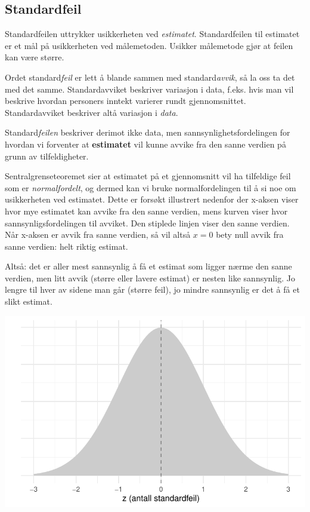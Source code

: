 \documentclass[
  letterpaper,
  DIV=11,
  numbers=noendperiod]{scrreprt}
\theoremstyle{definition}
\theoremstyle{remark}
\begin{document}
\hypertarget{standardfeil}{%
\subsection{Standardfeil}\label{standardfeil}}

Standardfeilen uttrykker usikkerheten ved \emph{estimatet}.
Standardfeilen til estimatet er et mål på usikkerheten ved målemetoden.
Usikker målemetode gjør at feilen kan være større.

Ordet standard\emph{feil} er lett å blande sammen med
standard\emph{avvik}, så la oss ta det med det samme. Standardavviket
beskriver variasjon i data, f.eks. hvis man vil beskrive hvordan
personers inntekt varierer rundt gjennomsnittet. Standardavviket
beskriver altå variasjon i \emph{data}.

Standard\emph{feilen} beskriver derimot ikke data, men
sannsynlighetsfordelingen for hvordan vi forventer at \textbf{estimatet}
vil kunne avvike fra den sanne verdien på grunn av tilfeldigheter.

Sentralgrenseteoremet sier at estimatet på et gjennomsnitt vil ha
tilfeldige feil som er \emph{normalfordelt}, og dermed kan vi bruke
normalfordelingen til å si noe om usikkerheten ved estimatet. Dette er
forsøkt illustrert nedenfor der x-aksen viser hvor mye estimatet kan
avvike fra den sanne verdien, mens kurven viser hvor
sannsynligsfordelingen til avviket. Den stiplede linjen viser den sanne
verdien. Når x-aksen er avvik fra sanne verdien, så vil altså \(x = 0\)
bety null avvik fra sanne verdien: helt riktig estimat.

Altså: det er aller mest sannsynlig å få et estimat som ligger nærme den
sanne verdien, men litt avvik (større eller lavere estimat) er nesten
like sannsynlig. Jo lengre til hver av sidene man går (større feil), jo
mindre sannsynlig er det å få et slikt estimat.

\includegraphics{./statistiskTolkning_files/figure-pdf/unnamed-chunk-1-1.pdf}
\end{document}
